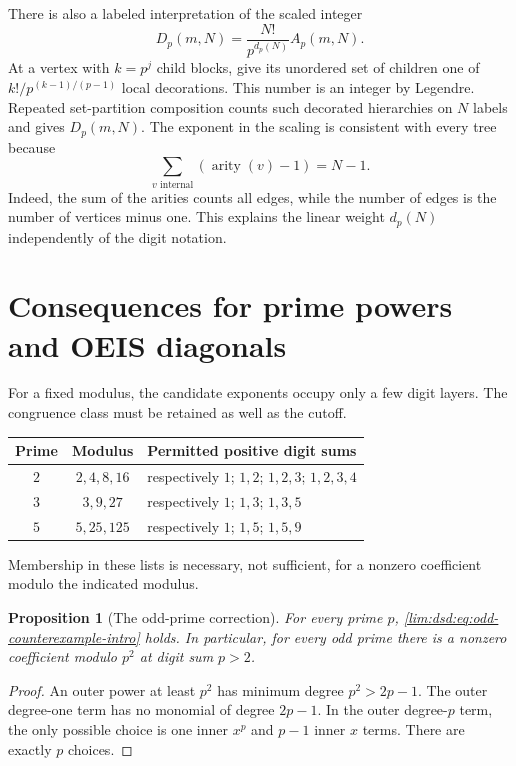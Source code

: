 \documentclass[11pt]{article}
\newtheorem{proposition}[theorem]{Proposition}
\theoremstyle{definition}
\theoremstyle{remark}
\begin{document}
There is also a labeled interpretation of the scaled integer
\[
 D_p(m,N)=\frac{N!}{p^{d_p(N)}}A_p(m,N).
\]
At a vertex with $k=p^j$ child blocks, give its unordered set of
children one of $k!/p^{(k-1)/(p-1)}$ local decorations. This number
is an integer by Legendre. Repeated set-partition composition counts
such decorated hierarchies on $N$ labels and gives $D_p(m,N)$.
The exponent in the scaling is consistent with every tree because
\begin{equation}
 \sum_{v\text{ internal}}(\operatorname{arity}(v)-1)=N-1.
 \label{lim:dsd:eq:tree-exponent}
\end{equation}
Indeed, the sum of the arities counts all edges, while the number of
edges is the number of vertices minus one. This explains the linear
weight $d_p(N)$ independently of the digit notation.

\section{Consequences for prime powers and OEIS diagonals}
\label{lim:dsd:sec:consequences}

For a fixed modulus, the candidate exponents occupy only a few digit
layers. The congruence class must be retained as well as the cutoff.
\begin{center}
\begin{tabular}{@{}ccl@{}}
\toprule
Prime & Modulus & Permitted positive digit sums\\
\midrule
$2$ & $2,4,8,16$ & respectively $1$; $1,2$; $1,2,3$; $1,2,3,4$\\
$3$ & $3,9,27$ & respectively $1$; $1,3$; $1,3,5$\\
$5$ & $5,25,125$ & respectively $1$; $1,5$; $1,5,9$\\
\bottomrule
\end{tabular}
\end{center}
Membership in these lists is necessary, not sufficient, for a nonzero
coefficient modulo the indicated modulus.

\begin{proposition}[The odd-prime correction]
\label{lim:dsd:prop:odd-correction}
For every prime $p$, \eqref{lim:dsd:eq:odd-counterexample-intro} holds.
In particular, for every odd prime there is a nonzero coefficient
modulo $p^2$ at digit sum $p>2$.
\end{proposition}
\begin{proof}
An outer power at least $p^2$ has minimum degree $p^2>2p-1$.
The outer degree-one term has no monomial of degree $2p-1$.
In the outer degree-$p$ term, the only possible choice is one inner
$x^p$ and $p-1$ inner $x$ terms. There are exactly $p$ choices.
\end{proof}
\end{document}
